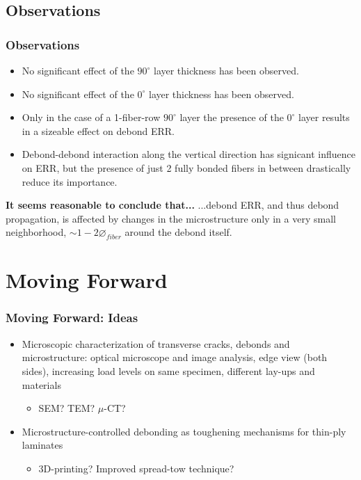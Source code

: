 \documentclass[first,firstsupp,lastsupp,last,hyperref,table]{ETHclass}
\begin{document}
\subsection{Observations}

\begin{frame}
\frametitle{Observations}
\vspace{-0.5cm}
\centering
\scriptsize
\begin{itemize}[label=]
\item No significant effect of the $90^{\circ}$ layer thickness has been observed.
\item No significant effect of the $0^{\circ}$ layer thickness has been observed.
\item Only in the case of a 1-fiber-row $90^{\circ}$ layer the presence of the $0^{\circ}$ layer results in a sizeable effect on debond ERR.
\item Debond-debond interaction along the vertical direction has signicant influence on ERR, but the presence of just 2 fully bonded fibers in between drastically reduce its importance.
\end{itemize}
\begin{alertblock}{\centering\scriptsize\bf It seems reasonable to conclude that...}
...debond ERR, and thus debond propagation, is affected by changes in the microstructure only in a very small neighborhood, $\sim1-2\diameter_{fiber}$ around the debond itself.
\end{alertblock}
\end{frame}

\section{Moving Forward}

\begin{frame}
\frametitle{Moving Forward: Ideas}
\vspace{-0.5cm}
\footnotesize
\centering
\begin{itemize}[label=$\RHD$]
\item Microscopic characterization of transverse cracks, debonds and microstructure: optical microscope and image analysis, edge view (both sides), increasing load levels on same specimen, different lay-ups and materials\\[7.5pt]
\begin{itemize}[label=]
\item SEM? TEM? $\mu$-CT?\\[20pt]
\end{itemize}
\item Microstructure-controlled debonding as toughening mechanisms for thin-ply laminates\\[7.5pt]
\begin{itemize}[label=]
\item 3D-printing? Improved spread-tow technique?
\end{itemize}
\end{itemize}
\end{frame}
\end{document}
